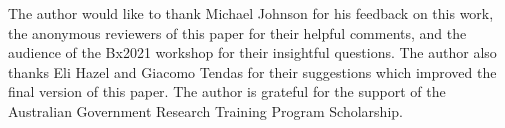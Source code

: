 \documentclass[colorlinks = true, a4paper, oneside, reqno, 11pt]{amsart}
\theoremstyle{definition}
\theoremstyle{remark}
\begin{document}
The author would like to thank Michael Johnson for his feedback on this work,
the anonymous reviewers of this paper for their helpful comments, 
and the audience of the Bx2021 workshop for their insightful questions.
The author also thanks Eli Hazel and Giacomo Tendas for their suggestions 
which improved the final version of this paper. 
The author is grateful for the support of the Australian Government Research 
Training Program Scholarship. 



\end{document}
